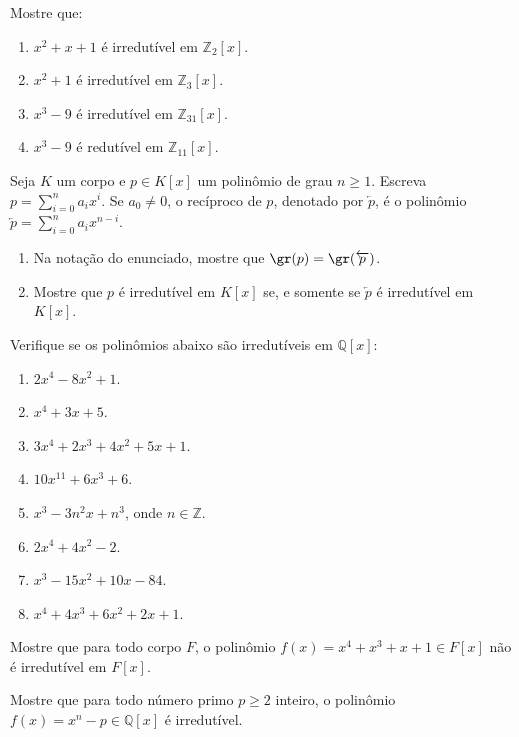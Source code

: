 \begin{exer} Mostre que:
    \begin{enumerate}
        \item $x^2 +x+1$ é irredutível em $\mathbb Z_2[x]$.
        \item $x^2 +1$ é irredutível em $\mathbb Z_3[x]$.
        \item $x^3-9$ é irredutível em $\mathbb Z_{31}[x]$.
        \item $x^3-9$ é redutível em $\mathbb Z_{11}[x]$.
    \end{enumerate}
\end{exer}

\begin{exer} Seja $K$ um corpo e $p \in K[x]$ um polinômio de grau $n\geq 1$. Escreva $p=\sum_{i=0}^n a_i x^i$. Se $a_0\neq 0$, o recíproco de $p$, denotado por $\overleftarrow{p}$, é o polinômio $\overleftarrow{p}=\sum_{i=0}^n a_i x^{n-i}$.
    \begin{enumerate}
        \item Na notação do enunciado, mostre que $\gr(p)=\gr(\overleftarrow{p})$.
        \item Mostre que $p$ é irredutível em $K[x]$ se, e somente se $\overleftarrow{p}$ é irredutível em $K[x]$.
    \end{enumerate}
\end{exer}

\begin{exer} Verifique se os polinômios abaixo são irredutíveis em $\mathbb Q[x]$:
    \begin{enumerate}
        \item $2x^4 - 8x^2 + 1$.
        \item $x^4 + 3x + 5$.
        \item $3x^4 + 2x^3 + 4x^2 + 5x + 1$.
        \item $10x^{11} + 6x^3 + 6$.
        \item $x^3 - 3n^2x + n^3$, onde $n \in \mathbb Z$.
        \item $2x^4 + 4x^2 - 2$.
        \item $x^3 - 15x^2 + 10x - 84$.
        \item $x^4 + 4x^3 + 6x^2 + 2x + 1$.
    \end{enumerate}
\end{exer}

\begin{exer} Mostre que para todo corpo $F$, o polinômio $f(x) = x^4 +x^3 +x+1 \in F[x]$ não é irredutível em $F[x]$.
\end{exer}

\begin{exer} Mostre que para todo número primo $p\geq 2$ inteiro, o polinômio $f(x) = x^n-p \in \mathbb Q[x]$ é irredutível.
\end{exer}